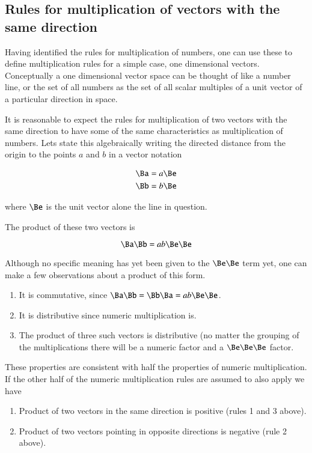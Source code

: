\subsection{Rules for multiplication of vectors with the same direction}

Having identified the rules for multiplication of numbers, one can use these to define multiplication rules for a simple case, one dimensional vectors.
Conceptually a one dimensional vector space can be thought of like a number line, or the set of all numbers as the set of all scalar multiples of a unit vector of a particular direction in space.

It is reasonable to expect the rules for multiplication of two vectors with the same direction to have some of the same characteristics as multiplication of numbers.  Lets state this algebraically writing the directed distance from the origin to the points $a$ and $b$ in a vector notation

\begin{align*}
\Ba &= a\Be \\
\Bb &= b\Be \\
\end{align*}

where $\Be$ is the unit vector alone the line in question.

The product of these two vectors is

\[
\Ba \Bb = a b \Be \Be
\]

Although no specific meaning has yet been given to the $\Be \Be$ term yet, one can make a few observations about a product of this form.
\begin{enumerate}
\item It is commutative, since $\Ba \Bb = \Bb \Ba = a b \Be \Be$.
\item It is distributive since numeric multiplication is.
\item The product of three such vectors is distributive (no matter the grouping of the multiplications there will be a numeric factor and a $\Be \Be \Be$ factor.
\end{enumerate}

These properties are consistent with half the properties of numeric multiplication.  If the other half of the numeric multiplication rules are assumed to also apply we have

\begin{enumerate}
\item Product of two vectors in the same direction is positive (rules 1 and 3 above).
\item Product of two vectors pointing in opposite directions is negative (rule 2 above).
\end{enumerate}


